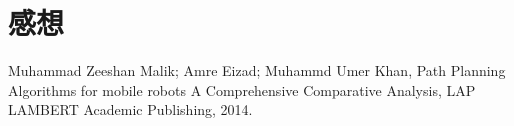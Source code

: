 \documentclass[a4paper,12pt]{jarticle}
\renewcommand{\theequation}{\arabic{section}.\arabic{equation}}
\begin{document}
\section*{感想}

\begin{thebibliography}{99}
   Muhammad Zeeshan Malik; Amre Eizad; Muhammd Umer Khan, Path Planning Algorithms for mobile robots A Comprehensive Comparative Analysis, LAP LAMBERT Academic Publishing, 2014.
\end{thebibliography}

\appendix
\def\thesection{付録\Alph{section}}
\def\thesubsection{\Alph{section}\arabic{subsection}}

\makeatletter
\renewcommand{\theequation}{\Alph{section}.\arabic{equation}}
\makeatother
\section{ }
\label{sec:}






\end{document}
